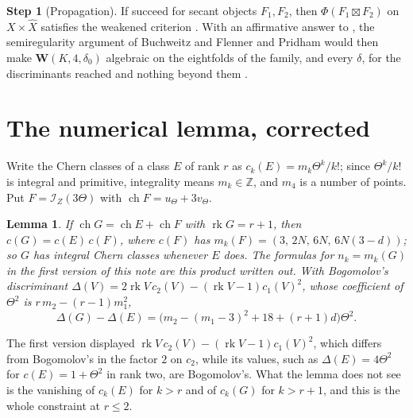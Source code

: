 \documentclass[11pt]{amsart}
\newtheorem{lemma}[theorem]{Lemma}
\theoremstyle{definition}
\newtheorem{step}[theorem]{Step}
\theoremstyle{remark}
\newcommand{\ZZ}{\mathbb{Z}}
\newcommand{\cI}{\mathcal{I}}
\newcommand{\ch}{\operatorname{ch}}
\begin{document}
\begin{step}[Propagation]\label{step:propagation}
If  succeed for secant
objects $F_{1},F_{2}$, then $\Phi(F_{1}\boxtimes F_{2})$ on
$X\times\widehat X$ satisfies the weakened criterion
\cite[Theorem~18.29(iv)]{BMB}. With an affirmative answer to
\cite[Question~11.4]{Mar25b}, the semiregularity argument of Buchweitz and
Flenner \cite{BF03} and Pridham \cite{Pri24} would then make
$\mathbf{W}(K,4,\delta_{0})$ algebraic on the eightfolds of the family, and
\cite[Proposition~20.13]{BMB} every $\delta$, for the discriminants reached
and nothing beyond them \cite[Remark~18.69]{BMB}.
\end{step}

\section{The numerical lemma, corrected}\label{sec:lemma}

Write the Chern classes of a class $E$ of rank $r$ as
$c_{k}(E)=m_{k}\Theta^{k}/k!$; since $\Theta^{k}/k!$ is integral and
primitive, integrality means $m_{k}\in\ZZ$, and $m_{4}$ is a number of
points. Put $F=\cI_{Z}(3\Theta)$ with $\ch F=u_{\Theta}+3v_{\Theta}$.

\begin{lemma}\label{lem:whitney}
If $\ch G=\ch E+\ch F$ with $\operatorname{rk}G=r+1$, then $c(G)=c(E)\,c(F)$,
where $c(F)$ has $m_{k}(F)=(3,\,2N,\,6N,\,6N(3-d))$; so $G$ has integral
Chern classes whenever $E$ does. The formulas for $n_{k}=m_{k}(G)$ in the
first version of this note are this product written out. With Bogomolov's
discriminant $\Delta(V)=2\operatorname{rk}V\,c_{2}(V)
-(\operatorname{rk}V-1)c_{1}(V)^{2}$, whose coefficient of $\Theta^{2}$ is
$r\,m_{2}-(r-1)m_{1}^{2}$,
\[
  \Delta(G)-\Delta(E)=\bigl(m_{2}-(m_{1}-3)^{2}+18+(r+1)d\bigr)\Theta^{2}.
\]
\end{lemma}

The first version displayed $\operatorname{rk}V\,c_{2}(V)
-(\operatorname{rk}V-1)c_{1}(V)^{2}$, which differs from Bogomolov's in the
factor $2$ on $c_{2}$, while its values, such as $\Delta(E)=4\Theta^{2}$ for
$c(E)=1+\Theta^{2}$ in rank two, are Bogomolov's. What the lemma does not
see is the vanishing of $c_{k}(E)$ for $k>r$ and of $c_{k}(G)$ for $k>r+1$,
and this is the whole constraint at $r\le2$.
\end{document}
